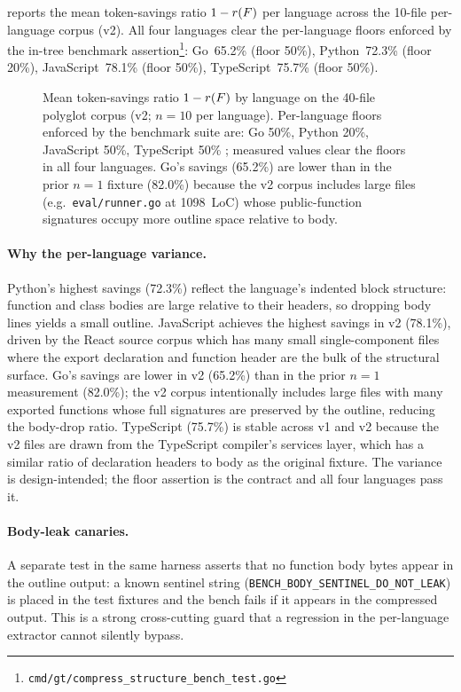  reports the mean token-savings ratio
$1 - r(F)$ per language across the 10-file per-language corpus
(v2). All four languages clear the per-language floors enforced by the
in-tree benchmark
assertion\footnote{\texttt{cmd/gt/compress\_structure\_bench\_test.go}}:
Go~65.2\% (floor 50\%), Python~72.3\% (floor 20\%),
JavaScript~78.1\% (floor 50\%), TypeScript~75.7\% (floor 50\%).

\begin{figure}[ht]
\centering

\caption{Mean token-savings ratio $1 - r(F)$ by language on
the 40-file polyglot corpus (v2; $n{=}10$ per language). Per-language
floors enforced by the benchmark suite are: Go 50\%, Python 20\%,
JavaScript 50\%, TypeScript 50\% \cite{blackrim_adr_0002}; measured
values clear the floors in all four languages. Go's savings (65.2\%)
are lower than in the prior $n{=}1$ fixture (82.0\%) because the v2
corpus includes large files (e.g.\ \texttt{eval/runner.go} at
1098~LoC) whose public-function signatures occupy more outline space
relative to body.}
\label{fig:compression}
\end{figure}

\paragraph{Why the per-language variance.}
Python's highest savings (72.3\%) reflect the language's indented
block structure: function and class bodies are large relative to their
headers, so dropping body lines yields a small outline. JavaScript
achieves the highest savings in v2 (78.1\%), driven by the React
source corpus which has many small single-component files where the
export declaration and function header are the bulk of the structural
surface. Go's savings are lower in v2 (65.2\%) than in the prior
$n{=}1$ measurement (82.0\%); the v2 corpus intentionally includes
large files with many exported functions whose full signatures are
preserved by the outline, reducing the body-drop ratio. TypeScript
(75.7\%) is stable across v1 and v2 because the v2 files are drawn
from the TypeScript compiler's services layer, which has a similar
ratio of declaration headers to body as the original fixture.
The variance is design-intended; the floor assertion is the contract
and all four languages pass it.

\paragraph{Body-leak canaries.} A separate test in the same harness
asserts that no function body bytes appear in the outline output: a
known sentinel string (\texttt{BENCH\_BODY\_SENTINEL\_DO\_NOT\_LEAK})
is placed in the test fixtures and the bench fails if it appears in
the compressed output. This is a strong cross-cutting guard that a
regression in the per-language extractor cannot silently bypass.

